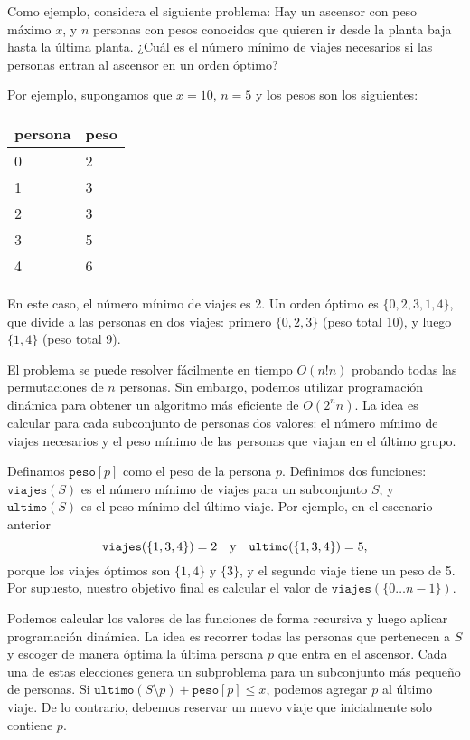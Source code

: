 Como ejemplo, considera el siguiente problema:
Hay un ascensor con peso máximo $x$,
y $n$ personas con pesos conocidos
que quieren ir desde la planta baja
hasta la última planta.
¿Cuál es el número mínimo de viajes necesarios
si las personas entran al ascensor en un orden óptimo?

Por ejemplo, supongamos que $x=10$, $n=5$
y los pesos son los siguientes:
\begin{center}
    \begin{tabular}{ll}
        persona & peso \\
        \hline
        0       & 2    \\
        1       & 3    \\
        2       & 3    \\
        3       & 5    \\
        4       & 6    \\
    \end{tabular}
\end{center}
En este caso, el número mínimo de viajes es 2.
Un orden óptimo es $\{0,2,3,1,4\}$,
que divide a las personas en dos viajes:
primero $\{0,2,3\}$ (peso total 10),
y luego $\{1,4\}$ (peso total 9).

El problema se puede resolver fácilmente en tiempo $O(n! n)$
probando todas las permutaciones de $n$ personas.
Sin embargo, podemos utilizar programación dinámica para obtener
un algoritmo más eficiente de $O(2^n n)$.
La idea es calcular para cada subconjunto de personas
dos valores: el número mínimo de viajes necesarios y
el peso mínimo de las personas que viajan en el último grupo.

Definamos $\texttt{peso}[p]$ como el peso de
la persona $p$.
Definimos dos funciones:
$\texttt{viajes}(S)$ es el número mínimo de
viajes para un subconjunto $S$,
y $\texttt{ultimo}(S)$ es el peso mínimo
del último viaje.
Por ejemplo, en el escenario anterior
\[ \texttt{viajes}(\{1,3,4\})=2 \hspace{10px} \textrm{y}
    \hspace{10px} \texttt{ultimo}(\{1,3,4\})=5,\]
porque los viajes óptimos son $\{1,4\}$ y $\{3\}$,
y el segundo viaje tiene un peso de 5.
Por supuesto, nuestro objetivo final es calcular el valor
de $\texttt{viajes}(\{0 \ldots n-1\})$.

Podemos calcular los valores
de las funciones de forma recursiva y luego aplicar
programación dinámica.
La idea es recorrer todas las personas
que pertenecen a $S$ y escoger de manera óptima
la última persona $p$ que entra en el ascensor.
Cada una de estas elecciones genera un subproblema
para un subconjunto más pequeño de personas.
Si $\texttt{ultimo}(S \setminus p)+\texttt{peso}[p] \le x$,
podemos agregar $p$ al último viaje.
De lo contrario, debemos reservar un nuevo viaje
que inicialmente solo contiene $p$.

